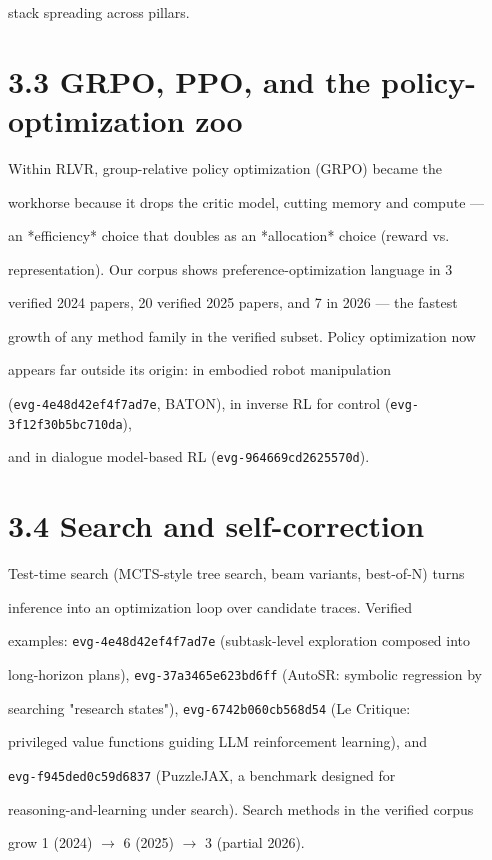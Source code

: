 \documentclass[11pt]{article}
\begin{document}
stack spreading across pillars.


\section{3.3 GRPO, PPO, and the policy-optimization zoo}

Within RLVR, group-relative policy optimization (GRPO) became the

workhorse because it drops the critic model, cutting memory and compute ---

an *efficiency* choice that doubles as an *allocation* choice (reward vs.

representation). Our corpus shows preference-optimization language in 3

verified 2024 papers, 20 verified 2025 papers, and 7 in 2026 --- the fastest

growth of any method family in the verified subset. Policy optimization now

appears far outside its origin: in embodied robot manipulation

(\texttt{evg-4e48d42ef4f7ad7e}, BATON), in inverse RL for control (\texttt{evg-3f12f30b5bc710da}),

and in dialogue model-based RL (\texttt{evg-964669cd2625570d}).


\section{3.4 Search and self-correction}

Test-time search (MCTS-style tree search, beam variants, best-of-N) turns

inference into an optimization loop over candidate traces. Verified

examples: \texttt{evg-4e48d42ef4f7ad7e} (subtask-level exploration composed into

long-horizon plans), \texttt{evg-37a3465e623bd6ff} (AutoSR: symbolic regression by

searching "research states"), \texttt{evg-6742b060cb568d54} (Le Critique:

privileged value functions guiding LLM reinforcement learning), and

\texttt{evg-f945ded0c59d6837} (PuzzleJAX, a benchmark designed for

reasoning-and-learning under search). Search methods in the verified corpus

grow 1 (2024) $\rightarrow$ 6 (2025) $\rightarrow$ 3 (partial 2026).
\end{document}
